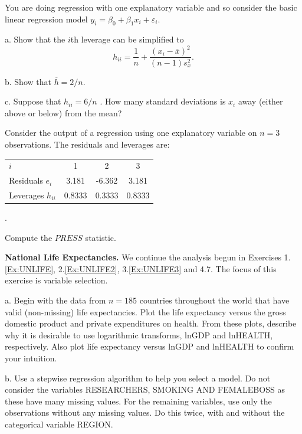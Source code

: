 \begin{exercises}


\item  You are doing regression with one explanatory variable and so
consider the basic linear regression model $y_i = \beta_0 +  \beta_1
x_i + \varepsilon_i$.

a.  Show that the $i$th leverage can be simplified to
\begin{equation*}
h_{ii} = \frac{1}{n} + \frac{(x_i - \overline{x})^2}{(n-1) s_x^2}.
\end{equation*}

b.  Show that  $\overline{h}= 2 / n$.

c.  Suppose that $h_{ii} = 6/n$ . How many standard deviations is
$x_i$ away (either above or below) from the mean?

\item Consider the output of a regression using one explanatory
variable on $n=3$ observations. The residuals and leverages are:
\begin{tabular}{l|ccc}
\hline
$i$ & 1 & 2 & 3 \\
Residuals $e_i$ & 3.181 & -6.362 & 3.181 \\
Leverages $h_{ii}$ & 0.8333 & 0.3333 & 0.8333\\ \hline
\end{tabular}.

Compute the $PRESS$ statistic.


\item \textbf{National Life Expectancies.}\label{Ex:UNLIFE4} We
continue the analysis begun in Exercises 1.\ref{Ex:UNLIFE},
2.\ref{Ex:UNLIFE2}, 3.\ref{Ex:UNLIFE3} and 4.7. The focus of this
exercise is variable selection.

a. Begin with the data from $n=185$ countries throughout the world
that have valid (non-missing) life expectancies. Plot the life
expectancy versus the gross domestic product and private
expenditures on health. From these plots, describe why it is
desirable to use logarithmic transforms, lnGDP and lnHEALTH,
respectively. Also plot life expectancy versus lnGDP and lnHEALTH to
confirm your intuition.

b. Use a stepwise regression algorithm to help you select a model.
Do not consider the variables RESEARCHERS, SMOKING AND FEMALEBOSS as
these have many missing values. For the remaining variables, use
only the observations without any missing values. Do this twice,
with and without the categorical variable REGION.


\end{exercises}
